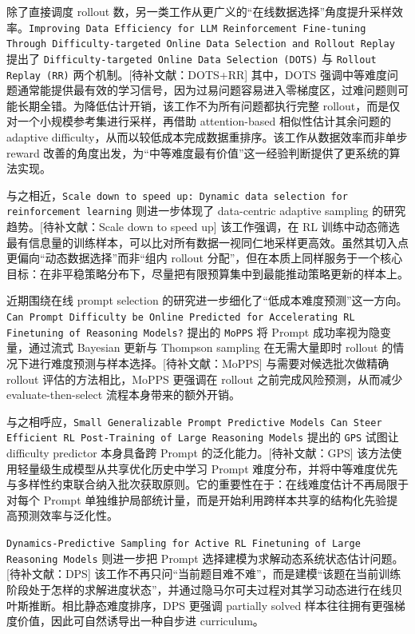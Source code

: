 除了直接调度 rollout 数，另一类工作从更广义的“在线数据选择”角度提升采样效率。\texttt{Improving Data Efficiency for LLM Reinforcement Fine-tuning Through Difficulty-targeted Online Data Selection and Rollout Replay} 提出了 \texttt{Difficulty-targeted Online Data Selection (DOTS)} 与 \texttt{Rollout Replay (RR)} 两个机制。[待补文献：DOTS+RR] 其中，DOTS 强调中等难度问题通常能提供最有效的学习信号，因为过易问题容易进入零梯度区，过难问题则可能长期全错。为降低估计开销，该工作不为所有问题都执行完整 rollout，而是仅对一个小规模参考集进行采样，再借助 attention-based 相似性估计其余问题的 adaptive difficulty，从而以较低成本完成数据重排序。该工作从数据效率而非单步 reward 改善的角度出发，为“中等难度最有价值”这一经验判断提供了更系统的算法实现。

与之相近，\texttt{Scale down to speed up: Dynamic data selection for reinforcement learning} 则进一步体现了 data-centric adaptive sampling 的研究趋势。[待补文献：Scale down to speed up] 该工作强调，在 RL 训练中动态筛选最有信息量的训练样本，可以比对所有数据一视同仁地采样更高效。虽然其切入点更偏向“动态数据选择”而非“组内 rollout 分配”，但在本质上同样服务于一个核心目标：在非平稳策略分布下，尽量把有限预算集中到最能推动策略更新的样本上。

近期围绕在线 prompt selection 的研究进一步细化了“低成本难度预测”这一方向。\texttt{Can Prompt Difficulty be Online Predicted for Accelerating RL Finetuning of Reasoning Models?} 提出的 \texttt{MoPPS} 将 Prompt 成功率视为隐变量，通过流式 Bayesian 更新与 Thompson sampling 在无需大量即时 rollout 的情况下进行难度预测与样本选择。[待补文献：MoPPS] 与需要对候选批次做精确 rollout 评估的方法相比，MoPPS 更强调在 rollout 之前完成风险预测，从而减少 evaluate-then-select 流程本身带来的额外开销。

与之相呼应，\texttt{Small Generalizable Prompt Predictive Models Can Steer Efficient RL Post-Training of Large Reasoning Models} 提出的 \texttt{GPS} 试图让 difficulty predictor 本身具备跨 Prompt 的泛化能力。[待补文献：GPS] 该方法使用轻量级生成模型从共享优化历史中学习 Prompt 难度分布，并将中等难度优先与多样性约束联合纳入批次获取原则。它的重要性在于：在线难度估计不再局限于对每个 Prompt 单独维护局部统计量，而是开始利用跨样本共享的结构化先验提高预测效率与泛化性。

\texttt{Dynamics-Predictive Sampling for Active RL Finetuning of Large Reasoning Models} 则进一步把 Prompt 选择建模为求解动态系统状态估计问题。[待补文献：DPS] 该工作不再只问“当前题目难不难”，而是建模“该题在当前训练阶段处于怎样的求解进度状态”，并通过隐马尔可夫过程对其学习动态进行在线贝叶斯推断。相比静态难度排序，DPS 更强调 partially solved 样本往往拥有更强梯度价值，因此可自然诱导出一种自步进 curriculum。

